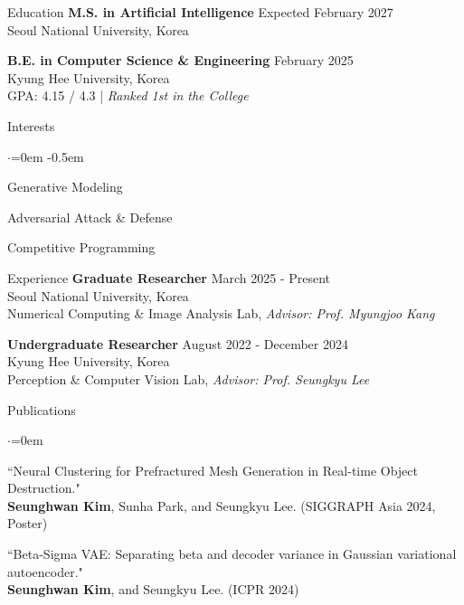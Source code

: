 \documentclass{resume}
\begin{document}
\begin{rSection}{Education}
  \textbf{M.S. in Artificial Intelligence} \hfill {Expected February 2027} \\
  { Seoul National University, Korea}

  \textbf{B.E. in Computer Science \& Engineering} \hfill {February 2025} \\
  { Kyung Hee University, Korea} \\
  { GPA: 4.15 / 4.3 | \textit{Ranked 1st in the College}}
\end{rSection}

\begin{rSection}{Interests}
  \begin{list}{$\cdot$}{\leftmargin=0em}
    \itemsep -0.5em
    \item Generative Modeling
    \item Adversarial Attack \& Defense
    \item Competitive Programming
  \end{list}
\end{rSection}

\begin{rSection}{Experience}
  \textbf{Graduate Researcher} \hfill {March 2025 - Present} \\
  { Seoul National University, Korea } \\
  { Numerical Computing \& Image Analysis Lab, \textit{Advisor: Prof. Myungjoo Kang}}

  \textbf{Undergraduate Researcher} \hfill {August 2022 - December 2024} \\
  { Kyung Hee University, Korea } \\
  { Perception \& Computer Vision Lab, \textit{Advisor: Prof. Seungkyu Lee}}
\end{rSection}

\begin{rSection}{Publications}
  \begin{list}{$\cdot$}{\leftmargin=0em}
    \item ``Neural Clustering for Prefractured Mesh Generation in Real-time Object Destruction." \\ {\bf Seunghwan Kim}, Sunha Park, and Seungkyu Lee. (SIGGRAPH Asia 2024, Poster)
    \item ``Beta-Sigma VAE: Separating beta and decoder variance in Gaussian variational autoencoder." \\ {\bf Seunghwan Kim}, and Seungkyu Lee. (ICPR 2024)
  \end{list}
\end{rSection}
\end{document}

